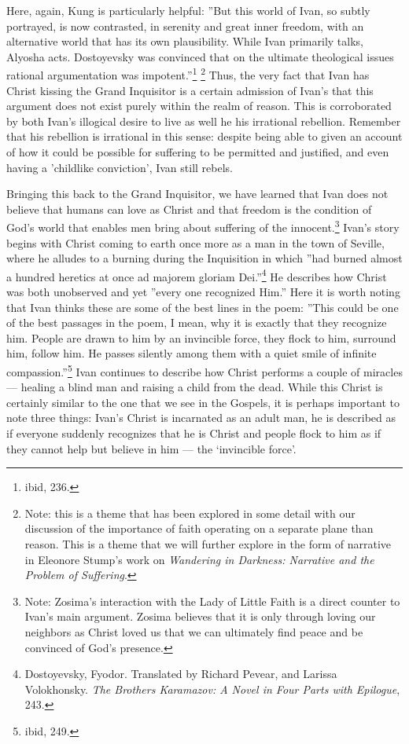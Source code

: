 Here, again, Kung is particularly helpful: ''But this world of Ivan, so subtly portrayed, is now contrasted, in serenity and great inner freedom, with an alternative world that has its own plausibility. While Ivan primarily talks, Alyosha acts. Dostoyevsky was convinced that on the ultimate theological issues rational argumentation was impotent.''\footnote{ibid, 236.} \footnote{Note: this is a theme that has been explored in some detail with our discussion of the importance of faith operating on a separate plane than reason. This is a theme that we will further explore in the form of narrative in Eleonore Stump's work on \emph{Wandering in Darkness: Narrative and the Problem of Suffering}.} Thus, the very fact that Ivan has Christ kissing the Grand Inquisitor is a certain admission of Ivan's that this argument does not exist purely within the realm of reason. This is corroborated by both Ivan's illogical desire to live as well he his irrational rebellion. Remember that his rebellion is irrational in this sense: despite being able to given an account of how it could be possible for suffering to be permitted and justified, and even having a 'childlike conviction', Ivan still rebels.

Bringing this back to the Grand Inquisitor, we have learned that Ivan does not believe that humans can love as Christ and that freedom is the condition of God's world that enables men bring about suffering of the innocent.\footnote{Note: Zosima's interaction with the Lady of Little Faith is a direct counter to Ivan's main argument. Zosima believes that it is only through loving our neighbors as Christ loved us that we can ultimately find peace and be convinced of God's presence.} Ivan's story begins with Christ coming to earth once more as a man in the town of Seville, where he alludes to a burning during the Inquisition in which ''had burned almost a hundred heretics at once ad majorem gloriam Dei.''\footnote{Dostoyevsky, Fyodor. Translated by Richard Pevear, and Larissa Volokhonsky. \emph{The Brothers Karamazov: A Novel in Four Parts with Epilogue}, 243.} He describes how Christ was both unobserved and yet ''every one recognized Him.'' Here it is worth noting that Ivan thinks these are some of the best lines in the poem: ''This could be one of the best passages in the poem, I mean, why it is exactly that they recognize him. People are drawn to him by an invincible force, they flock to him, surround him, follow him. He passes silently among them with a quiet smile of infinite compassion.''\footnote{ibid, 249.} Ivan continues to describe how Christ performs a couple of miracles --- healing a blind man and raising a child from the dead. While this Christ is certainly similar to the one that we see in the Gospels, it is perhaps important to note three things: Ivan's Christ is incarnated as an adult man, he is described as if everyone suddenly recognizes that he is Christ and people flock to him as if they cannot help but believe in him --- the `invincible force'.

